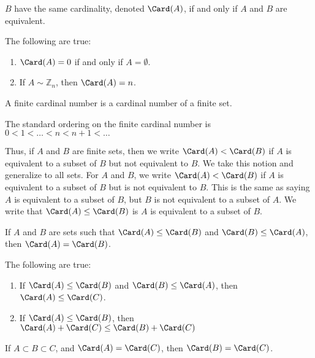    $B$ have the same cardinality, denoted
    $\Card(A)$, if and only if $A$ and $B$ are equivalent.
    \begin{theorem}
        The following are true:
        \begin{enumerate}
            \item $\Card(A)=0$ if and only if $A=\emptyset$.
            \item If ${A}\sim{\mathbb{Z}_{n}}$, then $\Card(A)=n$.
        \end{enumerate}
    \end{theorem}
    \begin{definition}
        A finite cardinal number is a cardinal
        number of a finite set.
    \end{definition}
    \begin{definition}
        The standard ordering on the finite cardinal
        number is $0<1<\hdots<n<n+1<\hdots$
    \end{definition}
    Thus, if $A$ and $B$ are finite sets, then we write
    $\Card(A)<\Card(B)$ if $A$ is equivalent to a
    subset of $B$ but not equivalent to $B$.
    We take this notion and generalize to
    all sets. For $A$ and $B$, we write
    $\Card(A)<\Card(B)$ if $A$ is equivalent to a subset
    of $B$ but is not equivalent to $B$. This is the
    same as saying $A$ is equivalent to a subset of $B$,
    but $B$ is not equivalent to a subset of $A$.
    We write that
    $\Card(A)\leq\Card(B)$ is $A$ is equivalent to a
    subset of $B$.
    \begin{theorem}
        If $A$ and $B$ are sets such that
        $\Card(A)\leq\Card(B)$ and
        $\Card(B)\leq\Card(A)$, then
        $\Card(A)=\Card(B)$.
    \end{theorem}
    \begin{theorem}
        The following are true:
        \begin{enumerate}
            \item If $\Card(A)\leq\Card(B)$ and
                  $\Card(B)\leq\Card(A)$, then
                  $\Card(A)\leq\Card(C)$.
            \item If $\Card(A)\leq\Card(B)$, then
                  $\Card(A)+\Card(C)\leq\Card(B)+\Card(C)$
        \end{enumerate}
    \end{theorem}
    \begin{theorem}
        If ${A}\subset{B}\subset{C}$, and
        $\Card(A)=\Card(C)$, then $\Card(B)=\Card(C)$.
    \end{theorem}
